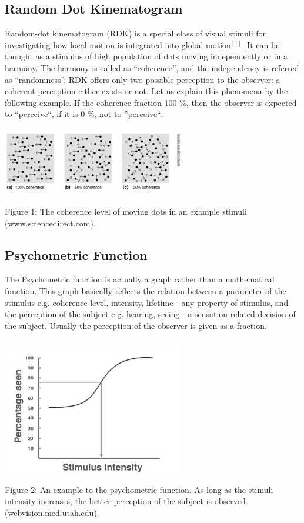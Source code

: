 \documentclass[twocolumn]{article}
\begin{document}
\subsection{Random Dot Kinematogram}
Random-dot kinematogram (RDK) is a special class of visual stimuli for investigating how local motion is integrated into global motion$^{[1]}$. It can be thought as a stimulus of high population of dots moving independently or in a harmony. The harmony is called as ``coherence'', and the independency is referred as ``randomness''. RDK offers only two possible perception to the observer: a coherent perception either exists or not. Let us explain this phenomena by the following example. If the coherence fraction 100 \%, then the observer is expected to ``perceive``, if it is 0 \%, not to ''perceive``.
\begin{center}
\includegraphics[width=80mm,height=30mm]{RDK.eps} 
   \begin{footnotesize} Figure 1: The coherence level of moving dots in an example stimuli (www.sciencedirect.com).  \end{footnotesize}
\end{center}
\subsection{Psychometric Function}
The Psychometric function is actually a graph rather than a mathematical function. This graph basically reflects the relation between a parameter of the stimulus e.g. coherence level, intensity, lifetime - any property of stimulus, and the perception of the subject e.g. hearing, seeing - a sensation related decision of the subject. Usually the perception of the observer is given as a fraction.
\begin{center}
\includegraphics[width=80mm,height=60mm]{psycho.eps} 
   \begin{footnotesize} Figure 2: An example to the psychometric function. As long as the stimuli intensity increases, the better perception of the subject is observed. (webvision.med.utah.edu).  \end{footnotesize}
\end{center}
\end{document}
